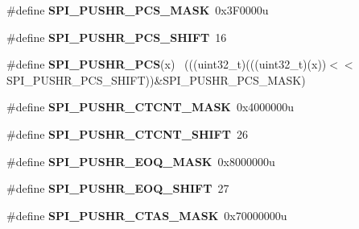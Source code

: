 \begin{DoxyCompactItemize}
\item 
\hypertarget{group___s_p_i___register___masks_gae2a7d0ea8a143281112074fe3745a70c}{}\#define {\bfseries S\+P\+I\+\_\+\+P\+U\+S\+H\+R\+\_\+\+P\+C\+S\+\_\+\+M\+A\+S\+K}~0x3\+F0000u\label{group___s_p_i___register___masks_gae2a7d0ea8a143281112074fe3745a70c}

\item 
\hypertarget{group___s_p_i___register___masks_gafb0dfe436cd6273ce0b0052aca58499e}{}\#define {\bfseries S\+P\+I\+\_\+\+P\+U\+S\+H\+R\+\_\+\+P\+C\+S\+\_\+\+S\+H\+I\+F\+T}~16\label{group___s_p_i___register___masks_gafb0dfe436cd6273ce0b0052aca58499e}

\item 
\hypertarget{group___s_p_i___register___masks_ga162a162d80d66bcf7f8ad20f5458330a}{}\#define {\bfseries S\+P\+I\+\_\+\+P\+U\+S\+H\+R\+\_\+\+P\+C\+S}(x)                                              ~(((uint32\+\_\+t)(((uint32\+\_\+t)(x))$<$$<$S\+P\+I\+\_\+\+P\+U\+S\+H\+R\+\_\+\+P\+C\+S\+\_\+\+S\+H\+I\+F\+T))\&S\+P\+I\+\_\+\+P\+U\+S\+H\+R\+\_\+\+P\+C\+S\+\_\+\+M\+A\+S\+K)\label{group___s_p_i___register___masks_ga162a162d80d66bcf7f8ad20f5458330a}

\item 
\hypertarget{group___s_p_i___register___masks_gad9e8859d590a59f5e208f5f4a2c8b873}{}\#define {\bfseries S\+P\+I\+\_\+\+P\+U\+S\+H\+R\+\_\+\+C\+T\+C\+N\+T\+\_\+\+M\+A\+S\+K}~0x4000000u\label{group___s_p_i___register___masks_gad9e8859d590a59f5e208f5f4a2c8b873}

\item 
\hypertarget{group___s_p_i___register___masks_ga7db8f0d7ae83f27f34eafd5e4d993ed1}{}\#define {\bfseries S\+P\+I\+\_\+\+P\+U\+S\+H\+R\+\_\+\+C\+T\+C\+N\+T\+\_\+\+S\+H\+I\+F\+T}~26\label{group___s_p_i___register___masks_ga7db8f0d7ae83f27f34eafd5e4d993ed1}

\item 
\hypertarget{group___s_p_i___register___masks_ga997edfebb20bfe6a385f018eb9a8a8fb}{}\#define {\bfseries S\+P\+I\+\_\+\+P\+U\+S\+H\+R\+\_\+\+E\+O\+Q\+\_\+\+M\+A\+S\+K}~0x8000000u\label{group___s_p_i___register___masks_ga997edfebb20bfe6a385f018eb9a8a8fb}

\item 
\hypertarget{group___s_p_i___register___masks_ga81e193cbd4602af43cd59a35e56fa958}{}\#define {\bfseries S\+P\+I\+\_\+\+P\+U\+S\+H\+R\+\_\+\+E\+O\+Q\+\_\+\+S\+H\+I\+F\+T}~27\label{group___s_p_i___register___masks_ga81e193cbd4602af43cd59a35e56fa958}

\item 
\hypertarget{group___s_p_i___register___masks_ga3ac8018fdfe57c16da2782e99232ae45}{}\#define {\bfseries S\+P\+I\+\_\+\+P\+U\+S\+H\+R\+\_\+\+C\+T\+A\+S\+\_\+\+M\+A\+S\+K}~0x70000000u\label{group___s_p_i___register___masks_ga3ac8018fdfe57c16da2782e99232ae45}


\end{DoxyCompactItemize}
